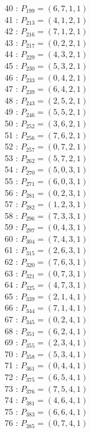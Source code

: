 \documentclass{article}
\begin{document}
{\begin{multicols}{3}
40 : $P_{199}=( 6, 7, 1, 1 )$\\
41 : $P_{213}=( 4, 1, 2, 1 )$\\
42 : $P_{216}=( 7, 1, 2, 1 )$\\
43 : $P_{217}=( 0, 2, 2, 1 )$\\
44 : $P_{229}=( 4, 3, 2, 1 )$\\
45 : $P_{230}=( 5, 3, 2, 1 )$\\
46 : $P_{233}=( 0, 4, 2, 1 )$\\
47 : $P_{239}=( 6, 4, 2, 1 )$\\
48 : $P_{243}=( 2, 5, 2, 1 )$\\
49 : $P_{246}=( 5, 5, 2, 1 )$\\
50 : $P_{252}=( 3, 6, 2, 1 )$\\
51 : $P_{256}=( 7, 6, 2, 1 )$\\
52 : $P_{257}=( 0, 7, 2, 1 )$\\
53 : $P_{262}=( 5, 7, 2, 1 )$\\
54 : $P_{270}=( 5, 0, 3, 1 )$\\
55 : $P_{271}=( 6, 0, 3, 1 )$\\
56 : $P_{281}=( 0, 2, 3, 1 )$\\
57 : $P_{282}=( 1, 2, 3, 1 )$\\
58 : $P_{296}=( 7, 3, 3, 1 )$\\
59 : $P_{297}=( 0, 4, 3, 1 )$\\
60 : $P_{304}=( 7, 4, 3, 1 )$\\
61 : $P_{315}=( 2, 6, 3, 1 )$\\
62 : $P_{320}=( 7, 6, 3, 1 )$\\
63 : $P_{321}=( 0, 7, 3, 1 )$\\
64 : $P_{325}=( 4, 7, 3, 1 )$\\
65 : $P_{339}=( 2, 1, 4, 1 )$\\
66 : $P_{344}=( 7, 1, 4, 1 )$\\
67 : $P_{345}=( 0, 2, 4, 1 )$\\
68 : $P_{351}=( 6, 2, 4, 1 )$\\
69 : $P_{355}=( 2, 3, 4, 1 )$\\
70 : $P_{358}=( 5, 3, 4, 1 )$\\
71 : $P_{361}=( 0, 4, 4, 1 )$\\
72 : $P_{375}=( 6, 5, 4, 1 )$\\
73 : $P_{376}=( 7, 5, 4, 1 )$\\
74 : $P_{381}=( 4, 6, 4, 1 )$\\
75 : $P_{383}=( 6, 6, 4, 1 )$\\
76 : $P_{385}=( 0, 7, 4, 1 )$\\

\end{multicols}}
\end{document}
